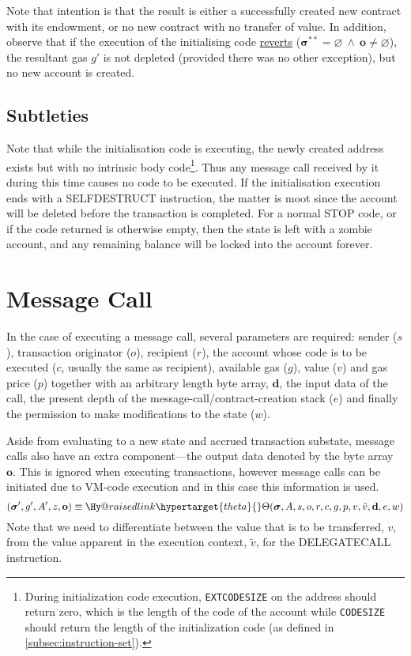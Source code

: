 \documentclass[9pt,oneside]{amsart}
\makeatletter
\newcommand{\linkdest}[1]{\Hy@raisedlink{\hypertarget{#1}{}}}
\makeatother
\begin{document}
\begin{multicols}{2}
Note that intention is that the result is either a successfully created new contract with its endowment, or no new contract with no transfer of value.
In addition, observe that if the execution of the initialising code \hyperlink{REVERT}{reverts} ($\boldsymbol{\sigma}^{**} = \varnothing \ \wedge\ \mathbf{o} \neq \varnothing$), the resultant gas $g'$ is not depleted (provided there was no other exception), but no new account is created.

\subsection{Subtleties}
Note that while the initialisation code is executing, the newly created address exists but with no intrinsic body code\footnote{During initialization code execution, \texttt{EXTCODESIZE} on the address should return zero, which is the length of the code of the account while \texttt{CODESIZE} should return the length of the initialization code (as defined in \ref{subsec:instruction-set}).}. Thus any message call received by it during this time causes no code to be executed. If the initialisation execution ends with a {\small SELFDESTRUCT} instruction, the matter is moot since the account will be deleted before the transaction is completed. For a normal {\small STOP} code, or if the code returned is otherwise empty, then the state is left with a zombie account, and any remaining balance will be locked into the account forever.

\section{Message Call} \label{ch:call}
In the case of executing a message call, several parameters are required: sender ($s$), transaction originator ($o$), recipient ($r$), the account whose code is to be executed ($c$, usually the same as recipient), available gas ($g$), value ($v$) and gas price ($p$) together with an arbitrary length byte array, $\mathbf{d}$, the input data of the call, the present depth of the message-call/contract-creation stack ($e$) and finally the permission to make modifications to the state ($w$).

Aside from evaluating to a new state and accrued transaction substate, message calls also have an extra component---the output data denoted by the byte array~$\mathbf{o}$. This is ignored when executing transactions, however message calls can be initiated due to VM-code execution and in this case this information is used.
\begin{equation}
(\boldsymbol{\sigma}', g', A', z, \mathbf{o}) \equiv \linkdest{theta}{\Theta}(\boldsymbol{\sigma}, A, s, o, r, c, g, p, v, \tilde{v}, \mathbf{d}, e, w)
\end{equation}
Note that we need to differentiate between the value that is to be transferred, $v$, from the value apparent in the execution context, $\tilde{v}$, for the {\small DELEGATECALL} instruction.


\end{multicols}
\end{document}
